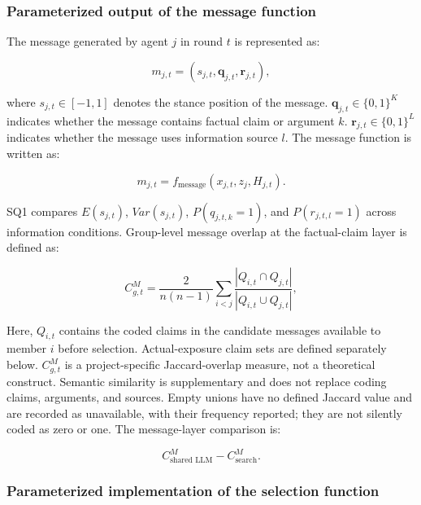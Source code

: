 \documentclass[11pt,a4paper]{article}
\begin{document}
\subsubsection{Parameterized output of the message function}

The message generated by agent $j$ in round $t$ is represented as:

\begin{equation*}
m_{j,t}
=
\left(
s_{j,t},
\mathbf q_{j,t},
\mathbf r_{j,t}
\right),
\end{equation*}

where $s_{j,t}\in[-1,1]$ denotes the stance position of the message. $\mathbf q_{j,t}\in\{0,1\}^{K}$ indicates whether the message contains factual claim or argument $k$. $\mathbf r_{j,t}\in\{0,1\}^{L}$ indicates whether the message uses information source $l$. The message function is written as:

\begin{equation*}
m_{j,t}
=
f_{\text{message}}
(x_{j,t},z_j,H_{j,t}).
\end{equation*}

SQ1 compares $E(s_{j,t})$, $Var(s_{j,t})$, $P(q_{j,t,k}=1)$, and $P(r_{j,t,l}=1)$ across information conditions. Group-level message overlap at the factual-claim layer is defined as:

\begin{equation*}
C^{M}_{g,t}
=
\frac{2}{n(n-1)}
\sum_{i<j}
\frac{|Q_{i,t}\cap Q_{j,t}|}
{|Q_{i,t}\cup Q_{j,t}|},
\end{equation*}

Here, $Q_{i,t}$ contains the coded claims in the candidate messages available to member $i$ before selection. Actual-exposure claim sets are defined separately below. $C^{M}_{g,t}$ is a project-specific Jaccard-overlap measure, not a theoretical construct. Semantic similarity is supplementary and does not replace coding claims, arguments, and sources. Empty unions have no defined Jaccard value and are recorded as unavailable, with their frequency reported; they are not silently coded as zero or one. The message-layer comparison is:

\begin{equation*}
C^{M}_{\text{shared LLM}}
-
C^{M}_{\text{search}}.
\end{equation*}

\subsubsection{Parameterized implementation of the selection function}
\end{document}
